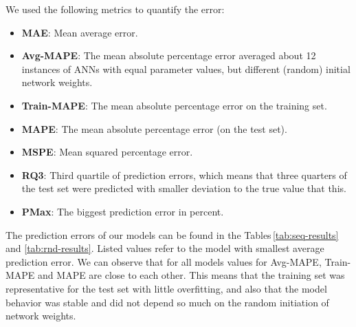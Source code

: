 \documentclass{superfri}
\begin{document}
	We used the following metrics to quantify the error:	
	\begin{itemize}
		\item \textbf{MAE}: Mean average error.
		\item \textbf{Avg-MAPE}: The mean absolute percentage error averaged about 12 instances of ANNs with equal parameter values, but different (random) initial network weights.
		\item \textbf{Train-MAPE}: The mean absolute percentage error on the training set. 
		\item \textbf{MAPE}: The mean absolute percentage error (on the test set).
		\item \textbf{MSPE}: Mean squared percentage error.
		\item \textbf{RQ3}: Third quartile of prediction errors, which means that three quarters of the test set were predicted with smaller deviation to the true value that this.
		\item \textbf{PMax}: The biggest prediction error in percent.
	\end{itemize}
	The prediction errors of our models can be found in the Tables\,\ref{tab:seq-results} and \ref{tab:rnd-results}.
	Listed values refer to the model with smallest average prediction error.
	We can observe that for all models values for Avg-MAPE, Train-MAPE and MAPE are close to each other.
	This means that the training set was representative for the test set with little overfitting, and also that the model behavior was stable and did not depend so much on the random initiation of network weights.
	
\end{document}
